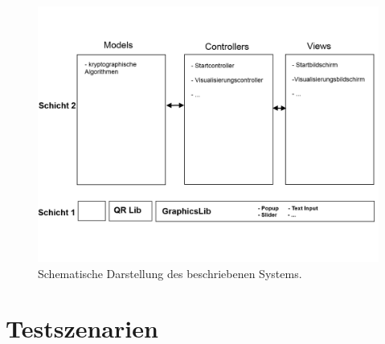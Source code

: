 \documentclass{article}
\begin{document}
\begin{figure}[h!]
  \centering
    \includegraphics[width=\textwidth]{resources/systemmodel-draft}
  \caption{Schematische Darstellung des beschriebenen Systems.}
\end{figure}


\section{Testszenarien}
\end{document}
